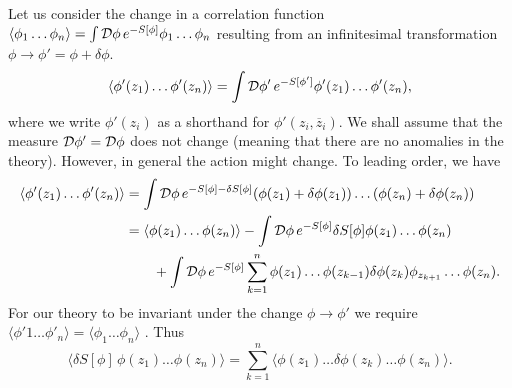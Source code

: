 Let us consider the change in a correlation function $\langle \phi_1 \dots \phi_n \rangle = \int \mathop{\mathcal{D} \phi} e^{-S[\phi]} \phi_1 \dots \phi_n$ resulting from an infinitesimal transformation $\phi \to \phi' = \phi + \delta \phi$.
\begin{equation}
  \langle \phi'(z_1) \dots \phi'(z_n) \rangle = \int \mathop{\mathcal{D} \phi'} e^{-S[\phi']} \phi'(z_1) \dots \phi'(z_n),
\end{equation}
where we write $\phi'(z_i)$ as a shorthand for $\phi'(z_i, \overline{z}{}_i)$.
We shall assume that the measure $\mathop{\mathcal{D} \phi'} = \mathop{\mathcal{D} \phi}$ does not change (meaning that there are no anomalies in the theory).
However, in general the action might change. To leading order, we have
\begin{align}
    \langle \phi'(z_1) \dots\phi'(z_n) \rangle &= \int \mathop{\mathcal{D} \phi} e^{-S[\phi] - \delta S[\phi]} (\phi(z_1) + \delta \phi(z_1)) \dots (\phi(z_n) + \delta \phi(z_n)) \\
					       &= \langle \phi(z_1) \dots \phi(z_n) \rangle - \int \mathop{\mathcal{D} \phi} e^{-S[\phi]} \delta S[\phi] \phi(z_1) \dots \phi(z_n) \\
					       & \qquad + \int \mathop{\mathcal{D} \phi} e^{-S[\phi]} \sum_{k=1}^{n} \phi(z_1) \dots \phi(z_{k-1}) \delta \phi(z_k) \phi_{z_{k+1}} \dots \phi(z_n).
\end{align}
For our theory to be invariant under the change $\phi \to \phi'$ we require  $\langle \phi'1 \dots \phi'_n \rangle = \langle \phi_1 \dots \phi_n \rangle$ . Thus
\begin{equation}
  \langle \delta S[\phi]\, \phi(z_1) \dots \phi(z_n) \rangle = \sum_{k=1}^{n} \langle \phi(z_1) \dots \delta \phi(z_k) \dots \phi(z_n) \rangle.
\end{equation}
